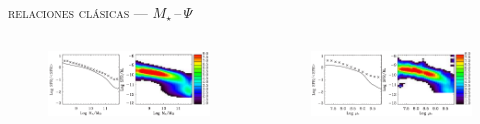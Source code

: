 \documentclass[xcolor=dvipsnames,4pt,hyperref={colorlinks,citecolor=black,linkcolor=black,urlcolor=black}]{beamer}
\begin{document}
\begin{frame}{\textsc{relaciones clásicas --- $M_\star\,$--$\,\Psi$}}

\begin{columns}
\begin{figure}
\includegraphics[scale=0.7]{img/brinchmann2004-24}
\end{figure}

\begin{figure}
\includegraphics[scale=0.7]{img/brinchmann2004-25}
\end{figure}

\end{columns}
\end{frame}
\end{document}
